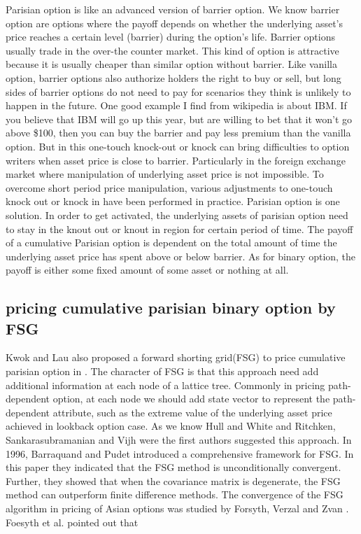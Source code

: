 \documentclass[11pt]{book}
\begin{document}
Parisian option is like an advanced version of barrier option. We know barrier option are options where the payoff depends on whether the underlying asset's price reaches a certain level (barrier) during the option's life. Barrier options usually trade in the over-the counter market. This kind of option is attractive because it is usually cheaper than similar option without barrier. Like vanilla option, barrier options also authorize holders the right to buy or sell, but  long sides of barrier options do not need to pay for scenarios they think is unlikely to happen in the future. One good example I find from wikipedia is about IBM. If you believe that IBM will go up this year, but are willing to bet that it won't go above \$100, then you can buy the barrier and pay less premium than the vanilla option. But in this one-touch knock-out or knock can bring difficulties to option writers when asset price is close to barrier. Particularly in the foreign exchange market where manipulation of underlying asset price is not impossible. To overcome short period price manipulation, various adjustments to one-touch knock out or knock in have been performed in practice. Parisian option is one solution.  In order to get activated, the underlying assets of parisian option need to stay in the knout out or knout in region for certain period of time. The payoff of a cumulative Parisian option is dependent on the total amount of time the underlying asset price has spent above or below barrier. As for binary option, the payoff is either some fixed amount of some asset or nothing at all. 

\subsection{pricing cumulative parisian binary option by FSG}
Kwok and Lau also proposed a forward shorting grid(FSG) to price cumulative parisian option in \cite{Kwok2001}. The character of FSG is that this approach need add additional information at each node of  a lattice tree. Commonly in pricing path-dependent option, at each node we should add state vector to represent the path-dependent attribute, such as the extreme value of the underlying asset price achieved in lookback option case. As we know Hull and White \cite{Hull1993} and Ritchken, Sankarasubramanian and Vijh \cite{Vijh1993} were the first authors suggested this approach. In 1996, Barraquand and Pudet \cite{Barraquand1996} introduced a comprehensive framework for FSG. In this paper they indicated that the FSG method is unconditionally convergent. Further, they showed that when the covariance matrix is degenerate, the FSG method can outperform finite difference methods. The convergence of the FSG algorithm in pricing of Asian options was studied by Forsyth, Verzal and Zvan \cite{Forsyth1999}. Foesyth et al. pointed out that    
 
\end{document}
